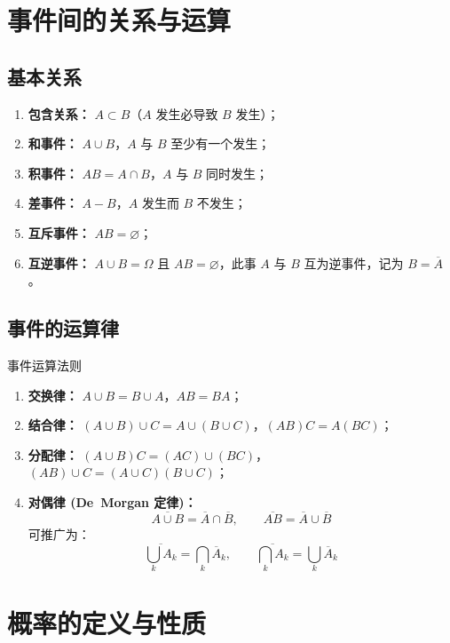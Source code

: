 \section{事件间的关系与运算}

\subsection{基本关系}

\begin{enumerate}
	\item \textbf{包含关系：} $A \subset B$（$A$ 发生必导致 $B$ 发生）；
	\item \textbf{和事件：} $A \cup B$，$A$ 与 $B$ 至少有一个发生；
	\item \textbf{积事件：} $AB = A \cap B$，$A$ 与 $B$ 同时发生；
	\item \textbf{差事件：} $A - B$，$A$ 发生而 $B$ 不发生；
	\item \textbf{互斥事件：} $AB = \varnothing$；
	\item \textbf{互逆事件：} $A \cup B = \Omega$ 且 $AB = \varnothing$，此事 $A$ 与 $B$ 互为逆事件，记为 $B = \overline{A}$。
\end{enumerate}

\subsection{事件的运算律}

\begin{myproperty}{事件运算法则}
\begin{enumerate}
	\item \textbf{交换律：} $A \cup B = B \cup A$，$AB = BA$；
	\item \textbf{结合律：} $(A \cup B) \cup C = A \cup (B \cup C)$，$(AB)C = A(BC)$；
	\item \textbf{分配律：} $(A \cup B)C = (AC) \cup (BC)$，$(AB) \cup C = (A \cup C)(B \cup C)$；
	\item \textbf{对偶律 (De~Morgan 定律)：}
	\[\overline{A \cup B} = \overline{A} \cap \overline{B},\qquad \overline{AB} = \overline{A} \cup \overline{B}\]
	可推广为：
	\[\overline{\bigcup_{k} A_k} = \bigcap_{k} \overline{A}_k,\qquad
	\overline{\bigcap_{k} A_k} = \bigcup_{k} \overline{A}_k\]
\end{enumerate}
\end{myproperty}

\section{概率的定义与性质}

